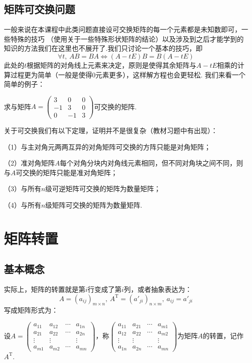 \subsection{矩阵可交换问题}
一般来说在本课程中此类问题直接设可交换矩阵的每一个元素都是未知数即可，一些特殊的技巧
（使用关于一些特殊形状矩阵的结论）以及涉及到之后才能学到的知识的方法我们在这里也不展开了.我们只讨论一个基本的技巧，即
$$\forall t,\ AB=BA \iff (A-tE)B=B(A-tE)$$
此处的$t$根据矩阵的对角线上元素来决定，原则是使得其余矩阵与$A-tE$相乘的计算过程更为简单（一般是使得0元素更多），这样解方程也会更轻松.
我们来看一个简单的例子：
\begin{example}
	求与矩阵$A=\begin{pmatrix}
		3 & 0 & 0 \\ -1 & 3 & 0 \\ 0 & -1 & 3
	\end{pmatrix}$可交换的矩阵.
\end{example}

关于可交换我们有以下定理，证明并不是很复杂（教材习题中有出现）：
\begin{theorem}
	\textup{（1）}与主对角元两两互异的对角矩阵可交换的方阵只能是对角矩阵；

	\textup{（2）}准对角矩阵$A$每个对角分块内对角线元素相同，但不同对角块之间不同，则与$A$可交换的矩阵只能是准对角矩阵；
	
	\textup{（3）}与所有$n$级可逆矩阵可交换的矩阵为数量矩阵；
	
	\textup{（4）}与所有$n$级矩阵可交换的矩阵为数量矩阵.
\end{theorem}

\section{矩阵转置}
\subsection{基本概念}
实际上，矩阵的转置就是第$i$行变成了第$i$列，或者抽象表达为：
$$A=(a_{ij})_{m \times n},\ A^\mathrm{T}=(a'_{ji})_{n \times m},\ a_{ij}=a'_{ji}$$
写成矩阵形式为：
\begin{definition}
	设$A=\begin{pmatrix}
		a_{11} & a_{12} & \cdots & a_{1n} \\
		a_{21} & a_{22} & \cdots & a_{2n} \\
		\vdots & \vdots &       & \vdots \\
		a_{m1} & a_{m2} & \cdots & a_{mn}
	\end{pmatrix}$，称$\begin{pmatrix}
		a_{11} & a_{21} & \cdots & a_{m1} \\
		a_{12} & a_{22} & \cdots & a_{m2} \\
		\vdots & \vdots &       & \vdots \\
		a_{1n} & a_{2n} & \cdots & a_{mn}
	\end{pmatrix}$为矩阵$A$的转置，记作$A^\mathrm{T}$.
\end{definition}

